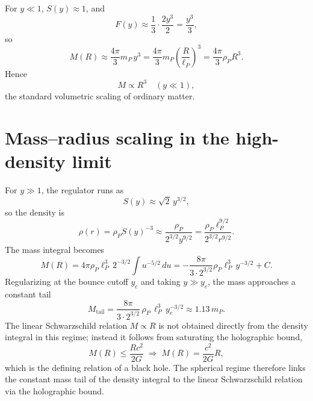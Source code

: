 \documentclass[12pt,oneside,openany]{book}
\begin{document}
For $y\ll 1$, $S(y)\approx 1$, and
\begin{equation}
F(y)\approx \frac{1}{3}\cdot\frac{2y^{3}}{2}=\frac{y^{3}}{3},
\label{eq:F-low}
\end{equation}
so
\begin{equation}
M(R)\approx \frac{4\pi}{3}m_{P}\,y^{3}
=
\frac{4\pi}{3}m_{P}\left(\frac{R}{\ell_{P}}\right)^{3}
=
\frac{4\pi}{3}\rho_{P}R^{3}.
\label{eq:M-low}
\end{equation}
Hence
\begin{equation}
\boxed{\;M\propto R^{3}\quad (y\ll 1),\;}
\label{eq:scaling-cubic}
\end{equation}
the standard volumetric scaling of ordinary matter.

\section{Mass--radius scaling in the high-density limit}

For $y\gg 1$, the regulator runs as
\begin{equation}
S(y)\approx\sqrt{2}\,y^{3/2},
\label{eq:S-high}
\end{equation}
so the density is
\begin{equation}
\rho(r)=\rho_{P}S(y)^{-3}
\approx
\frac{\rho_{P}}{2^{3/2}y^{9/2}}
=
\frac{\rho_{P}\ell_{P}^{9/2}}{2^{3/2}r^{9/2}}.
\label{eq:rho-high}
\end{equation}
The mass integral becomes
\begin{equation}
M(R)
=
4\pi\rho_{P}\ell_{P}^{3}\,2^{-3/2}
\int u^{-5/2}\,du
=
-\frac{8\pi}{3\cdot 2^{3/2}}\rho_{P}\ell_{P}^{3}\,y^{-3/2}
+
C.
\label{eq:M-high-raw}
\end{equation}
Regularizing at the bounce cutoff $y_{c}$ and taking $y\gg
y_{c}$, the mass approaches a constant tail
\begin{equation}
M_{\text{tail}}
=
\frac{8\pi}{3\cdot 2^{3/2}}\,\rho_{P}\,\ell_{P}^{3}\,y_{c}^{-3/2}
\approx
1.13\,m_{P}.
\label{eq:M-tail}
\end{equation}
The linear Schwarzschild relation $M\propto R$ is not obtained
directly from the density integral in this regime; instead it
follows from saturating the holographic bound,
\begin{equation}
M(R)\le \frac{Rc^{2}}{2G}
\;\Longrightarrow\;
M(R)=\frac{c^{2}}{2G}R,
\label{eq:Schwarzschild}
\end{equation}
which is the defining relation of a black hole. The spherical
regime therefore links the constant mass tail of the density
integral to the linear Schwarzschild relation via the
holographic bound.
\end{document}
